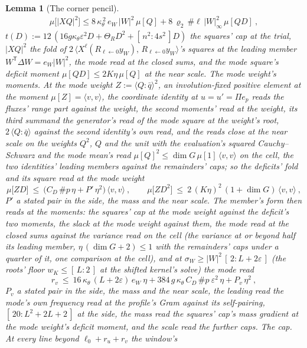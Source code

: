 \documentclass[11pt]{article}
\newtheorem{lemma}{Lemma}
\theoremstyle{definition}
\begin{document}
\begin{lemma}[The corner pencil]
\begin{gather*}
\mu\big[|XQ|^{2}\big]\le8\,\kappa_\theta^{\,2}\,e_W\,|W|^{2}\,\mu[Q]
+8\,\varrho_2\,\#\ell\,|W|_\infty^{2}\,\mu[QD]\ ,
\end{gather*}
$t(D):=12\,(16g\kappa_\theta\varepsilon^{2}D+\Theta_RD^{2}+[\,n^{2}:4s^{2}\,]D)$
the squares' cap at the trial, $|XQ|^{2}$ the fold of
$2\,\langle X^{\ell}(R_{\ell\leftarrow0}y_W),\,R_{\ell\leftarrow0}y_W\rangle$'s
squares at the leading member $W^{\mathsf T}\Delta W=e_W|W|^{2}$, the
mode read at the closed sums, and the mode square's deficit moment
$\mu[QD]\le2K\eta\,\mu[Q]$ at the near scale. \emph{The mode
weight's moments.} At the \emph{mode weight}
$Z:=\langle Q\!:\!\bar q\rangle^{2}$, an involution-fixed positive
element at the moment $\mu[Z]=\langle v,v\rangle$, the coordinate
identity at $u=u'=\Pi e_p$ reads the fluxes' range part against the
weight, the second moments' read at the weight, its third summand the generator's read of the
mode square at the weight's root, $2\,\langle Q\!:\!\bar q\rangle$
against the second identity's own read, and the reads close at the
near scale on the weights $Q^{2}$, $Q$ and the unit with the
evaluation's squared Cauchy--Schwarz and the \emph{mode mean's read}
$\mu[Q]^{2}\le\dim G\,\mu[1]\,\langle v,v\rangle$ on the cell, the
two identities' leading members against the remainders' caps; so the
deficits' fold and its square read at the mode weight
\[
\mu\big[ZD\big]\ \le\ \big(C_D\,\#p\,\eta+P'\,\eta^{2}\big)\,\langle v,v\rangle\ ,
\qquad
\mu\big[ZD^{2}\big]\ \le\ 2\,(K\eta)^{2}\,(1+\dim G)\,\langle v,v\rangle\ ,
\]
$P'$ a stated pair in the side, the mass and the near scale. The
member's form then reads at the moments: the squares' cap at the
mode weight against the deficit's two moments, the slack at the mode
weight against them, the mode read at the closed sums against the
variance read on the cell (the variance at or beyond half its
leading member, $\eta\,(\dim G+2)\le1$ with the remainders' caps
under a quarter of it, one comparison at the cell), and at
$\sigma_W\ge|W|^{2}\,[\,2:L+2\varepsilon\,]$ (the roots' floor
$w_K\le[\,L:2\,]$ at the shifted kernel's solve) the \emph{mode
read}
\[
r_v\ \le\ 16\,\kappa_\theta\,(L+2\varepsilon)\,e_W\ \eta
+384\,g\,\kappa_\theta\,C_D\,\#p\ \varepsilon^{2}\,\eta+P_v\,\eta^{2}\ ,
\]
$P_v$ a stated pair in the side, the mass and the near scale, the
leading read the mode's own frequency read at the profile's Gram
against its self-pairing, $[\,20:L^{2}+2L+2\,]$ at the side, the
mass read the squares' cap's mass gradient at the mode weight's
deficit moment, and the scale read the further caps.
\emph{The cap.} At every line beyond $\ell_0+r_u+r_v$ the window's

\end{lemma}
\end{document}
